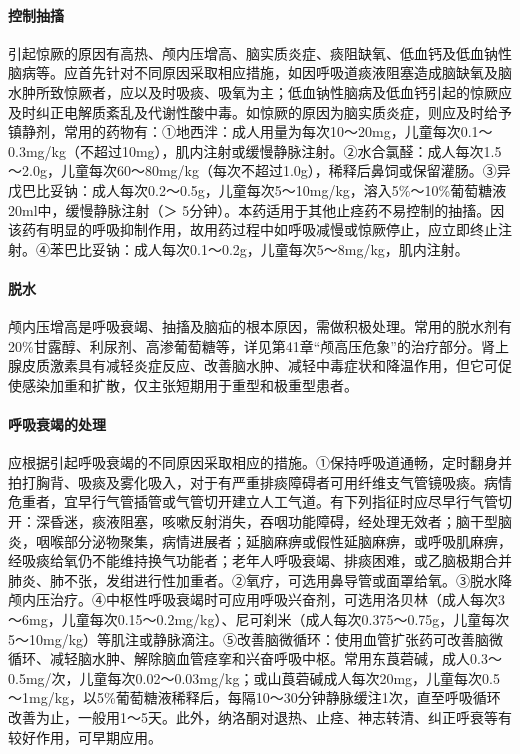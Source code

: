 \paragraph{控制抽搐}

引起惊厥的原因有高热、颅内压增高、脑实质炎症、痰阻缺氧、低血钙及低血钠性脑病等。应首先针对不同原因采取相应措施，如因呼吸道痰液阻塞造成脑缺氧及脑水肿所致惊厥者，应以及时吸痰、吸氧为主；低血钠性脑病及低血钙引起的惊厥应及时纠正电解质紊乱及代谢性酸中毒。如惊厥的原因为脑实质炎症，则应及时给予镇静剂，常用的药物有：①地西泮：成人用量为每次10～20mg，儿童每次0.1～0.3mg/kg（不超过10mg），肌内注射或缓慢静脉注射。②水合氯醛：成人每次1.5～2.0g，儿童每次60～80mg/kg（每次不超过1.0g），稀释后鼻饲或保留灌肠。③异戊巴比妥钠：成人每次0.2～0.5g，儿童每次5～10mg/kg，溶入5\%～10\%葡萄糖液20ml中，缓慢静脉注射（＞
5分钟）。本药适用于其他止痉药不易控制的抽搐。因该药有明显的呼吸抑制作用，故用药过程中如呼吸减慢或惊厥停止，应立即终止注射。④苯巴比妥钠：成人每次0.1～0.2g，儿童每次5～8mg/kg，肌内注射。

\paragraph{脱水}

颅内压增高是呼吸衰竭、抽搐及脑疝的根本原因，需做积极处理。常用的脱水剂有20\%甘露醇、利尿剂、高渗葡萄糖等，详见第41章“颅高压危象”的治疗部分。肾上腺皮质激素具有减轻炎症反应、改善脑水肿、减轻中毒症状和降温作用，但它可促使感染加重和扩散，仅主张短期用于重型和极重型患者。

\paragraph{呼吸衰竭的处理}

应根据引起呼吸衰竭的不同原因采取相应的措施。①保持呼吸道通畅，定时翻身并拍打胸背、吸痰及雾化吸入，对于有严重排痰障碍者可用纤维支气管镜吸痰。病情危重者，宜早行气管插管或气管切开建立人工气道。有下列指征时应尽早行气管切开：深昏迷，痰液阻塞，咳嗽反射消失，吞咽功能障碍，经处理无效者；脑干型脑炎，咽喉部分泌物聚集，病情进展者；延脑麻痹或假性延脑麻痹，或呼吸肌麻痹，经吸痰给氧仍不能维持换气功能者；老年人呼吸衰竭、排痰困难，或乙脑极期合并肺炎、肺不张，发绀进行性加重者。②氧疗，可选用鼻导管或面罩给氧。③脱水降颅内压治疗。④中枢性呼吸衰竭时可应用呼吸兴奋剂，可选用洛贝林（成人每次3～6mg，儿童每次0.15～0.2mg/kg）、尼可刹米（成人每次0.375～0.75g，儿童每次5～10mg/kg）等肌注或静脉滴注。⑤改善脑微循环：使用血管扩张药可改善脑微循环、减轻脑水肿、解除脑血管痉挛和兴奋呼吸中枢。常用东莨菪碱，成人0.3～0.5mg/次，儿童每次0.02～0.03mg/kg；或山莨菪碱成人每次20mg，儿童每次0.5～1mg/kg，以5\%葡萄糖液稀释后，每隔10～30分钟静脉缓注1次，直至呼吸循环改善为止，一般用1～5天。此外，纳洛酮对退热、止痉、神志转清、纠正呼衰等有较好作用，可早期应用。

